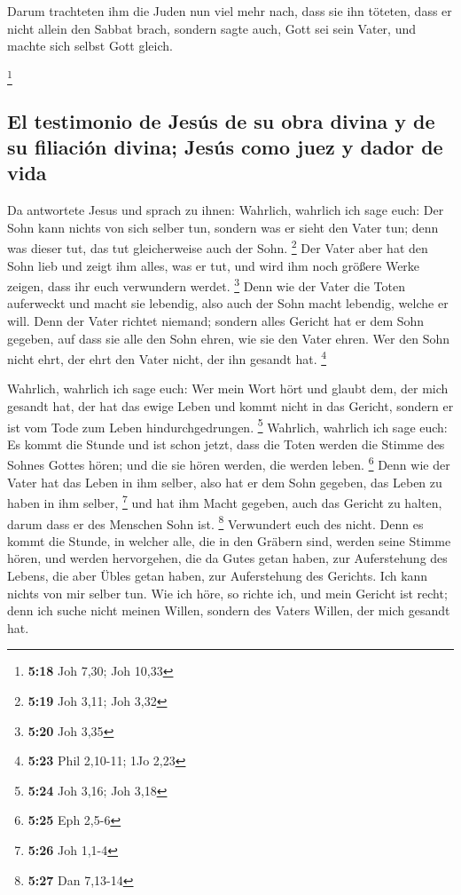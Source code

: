  Darum trachteten ihm die Juden nun viel mehr nach, dass
sie ihn töteten, dass er nicht allein den Sabbat brach, sondern sagte
auch, Gott sei sein Vater, und machte sich selbst Gott gleich.

\footnote{\textbf{5:18} Joh 7,30; Joh 10,33}

\hypertarget{el-testimonio-de-jesuxfas-de-su-obra-divina-y-de-su-filiaciuxf3n-divina-jesuxfas-como-juez-y-dador-de-vida}{%
\subsection{El testimonio de Jesús de su obra divina y de su filiación
divina; Jesús como juez y dador de
vida}\label{el-testimonio-de-jesuxfas-de-su-obra-divina-y-de-su-filiaciuxf3n-divina-jesuxfas-como-juez-y-dador-de-vida}}

 Da antwortete Jesus und sprach zu ihnen: Wahrlich,
wahrlich ich sage euch: Der Sohn kann nichts von sich selber tun,
sondern was er sieht den Vater tun; denn was dieser tut, das tut
gleicherweise auch der Sohn. \footnote{\textbf{5:19} Joh 3,11; Joh 3,32}
 Der Vater aber hat den Sohn lieb und zeigt ihm alles,
was er tut, und wird ihm noch größere Werke zeigen, dass ihr euch
verwundern werdet. \footnote{\textbf{5:20} Joh 3,35} 
Denn wie der Vater die Toten auferweckt und macht sie lebendig, also
auch der Sohn macht lebendig, welche er will.  Denn der
Vater richtet niemand; sondern alles Gericht hat er dem Sohn gegeben,
 auf dass sie alle den Sohn ehren, wie sie den Vater
ehren. Wer den Sohn nicht ehrt, der ehrt den Vater nicht, der ihn
gesandt hat. \footnote{\textbf{5:23} Phil 2,10-11; 1Jo 2,23}

 Wahrlich, wahrlich ich sage euch: Wer mein Wort hört und
glaubt dem, der mich gesandt hat, der hat das ewige Leben und kommt
nicht in das Gericht, sondern er ist vom Tode zum Leben
hindurchgedrungen. \footnote{\textbf{5:24} Joh 3,16; Joh 3,18}
 Wahrlich, wahrlich ich sage euch: Es kommt die Stunde
und ist schon jetzt, dass die Toten werden die Stimme des Sohnes Gottes
hören; und die sie hören werden, die werden leben. \footnote{\textbf{5:25}
  Eph 2,5-6}  Denn wie der Vater hat das Leben in ihm
selber, also hat er dem Sohn gegeben, das Leben zu haben in ihm selber,
\footnote{\textbf{5:26} Joh 1,1-4}  und hat ihm Macht
gegeben, auch das Gericht zu halten, darum dass er des Menschen Sohn
ist. \footnote{\textbf{5:27} Dan 7,13-14}  Verwundert
euch des nicht. Denn es kommt die Stunde, in welcher alle, die in den
Gräbern sind, werden seine Stimme hören,  und werden
hervorgehen, die da Gutes getan haben, zur Auferstehung des Lebens, die
aber Übles getan haben, zur Auferstehung des Gerichts. 
Ich kann nichts von mir selber tun. Wie ich höre, so richte ich, und
mein Gericht ist recht; denn ich suche nicht meinen Willen, sondern des
Vaters Willen, der mich gesandt hat.

